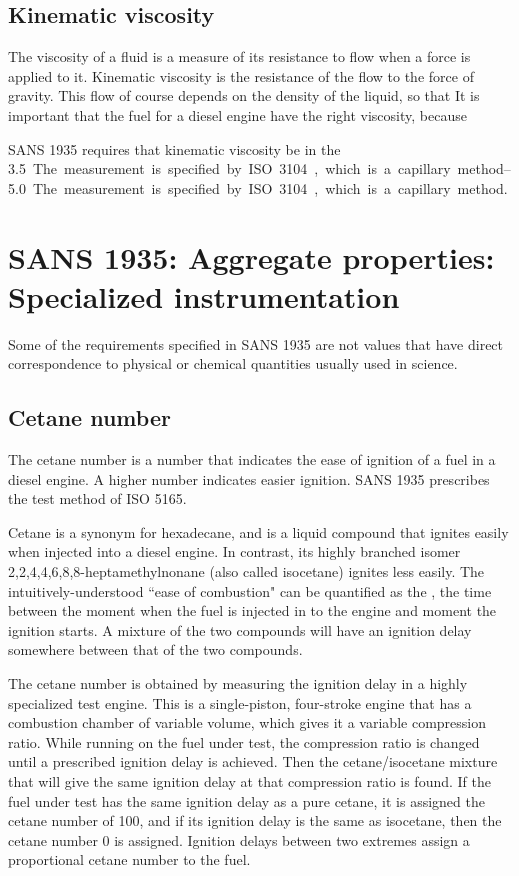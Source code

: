 \subsection{Kinematic viscosity}

The viscosity of a fluid is a measure of its resistance to flow when a force is
applied to it. Kinematic viscosity is the resistance of the flow to the force of
gravity. This flow of course depends on the density of the liquid, so that It is
important that the fuel for a diesel engine have the right viscosity, because

SANS 1935 requires that kinematic viscosity be in the \SIrange{3.5}{5.0}. The
measurement is specified by ISO 3104, which is a capillary method.

\section{SANS 1935: Aggregate properties: Specialized instrumentation}

Some of the requirements specified in SANS 1935 are not values that have direct
correspondence to physical or chemical quantities usually used in science. 

\subsection{Cetane number}

The cetane number is a number that indicates the ease of ignition of a fuel in a
diesel engine. A higher number indicates easier ignition. SANS 1935 prescribes
the test method of ISO 5165.

Cetane is a synonym for hexadecane, and is a liquid compound that ignites easily
when injected into a diesel engine. In contrast, its highly branched isomer
2,2,4,4,6,8,8-heptamethylnonane (also called isocetane) ignites less easily. The
intuitively-understood ``ease of combustion" can be quantified as the
, the time between the moment when the fuel is injected
in to the engine and moment the ignition starts. A mixture of the two compounds
will have an ignition delay somewhere between that of the two compounds.

The cetane number is obtained by measuring the ignition delay in a  highly
specialized test engine. This is a single-piston, four-stroke engine that has a
combustion chamber of variable volume, which gives it a variable compression
ratio. While running on the fuel under test, the compression ratio is changed
until a prescribed ignition delay is achieved. Then the cetane/isocetane mixture
that will give the same ignition delay at that compression ratio is found. If
the fuel under test has the same ignition delay as a pure cetane, it is assigned
the cetane number of 100, and if its ignition delay is the same as isocetane,
then the cetane number 0 is assigned. Ignition delays between two extremes
assign a proportional cetane number to the fuel.

